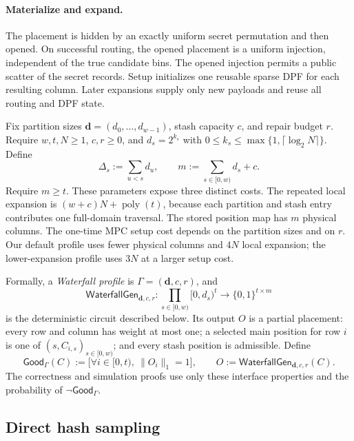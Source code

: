 \paragraph{Materialize and expand.}
The placement is hidden by an exactly uniform secret permutation and then
opened. On successful routing, the opened placement is a uniform injection, independent of
the true candidate bins.  The opened injection permits a public scatter of the
secret records.  Setup initializes one reusable sparse DPF for each resulting
column.  Later expansions supply only new payloads and reuse all routing and
DPF state.

Fix partition sizes $\mathbf d=(d_0,\ldots,d_{w-1})$, stash capacity $c$, and
repair budget $r$. Require $w,t,N\geq1$, $c,r\geq0$, and
$d_s=2^{k_s}$ with $0\leq k_s\leq\max\{1,\lceil\log_2N\rceil\}$.
Define
\[
 \Delta_s:=\sum_{u<s}d_u,
 \qquad
 m:=\sum_{s\in[0,w)}d_s+c.
\]
Require $m\geq t$. These parameters expose three distinct costs.  The repeated local expansion
is $(w+c)N+\operatorname{poly}(t)$, because each partition and stash entry
contributes one full-domain traversal.  The stored position map has $m$
physical columns.  The one-time MPC setup cost depends on the partition sizes
and on $r$. Our default profile uses fewer physical columns and $4N$
local expansion; the lower-expansion profile uses $3N$ at a larger setup cost.

Formally, a \emph{Waterfall profile} is
$\Gamma=(\mathbf d,c,r)$, and
\begin{equation}\label{eq:waterfall-generator-interface}
 \mathsf{WaterfallGen}_{\mathbf d,c,r}:
 \prod_{s\in[0,w)}[0,d_s)^t\longrightarrow\{0,1\}^{t\times m}
\end{equation}
is the deterministic circuit described below.  Its output $O$ is a partial
placement: every row and column has weight at most one; a selected main
position for row $i$ is one of $(s,C_{i,s})_{s\in[0,w)}$; and every stash
position is admissible.  Define
\begin{equation}\label{eq:waterfall-generator-success}
 \mathsf{Good}_\Gamma(C):=
 \bigl[\forall i\in[0,t),\ \lVert O_i\rVert_1=1\bigr],
 \qquad O:=\mathsf{WaterfallGen}_{\mathbf d,c,r}(C).
\end{equation}
The correctness and simulation proofs use only these interface properties and
the probability of $\neg\mathsf{Good}_\Gamma$.

\subsection{Direct hash sampling}\label{sec:waterfallHashSampling}

